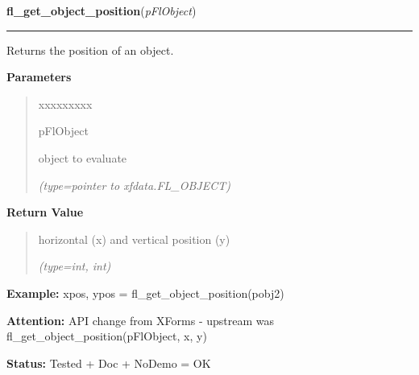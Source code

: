     \vspace{0.5ex}

\hspace{.8\funcindent}\begin{boxedminipage}{\funcwidth}

    \raggedright \textbf{fl\_get\_object\_position}(\textit{pFlObject})

    \vspace{-1.5ex}

    \rule{\textwidth}{0.5\fboxrule}
\setlength{\parskip}{2ex}
    Returns the position of an object.

\setlength{\parskip}{1ex}
      \textbf{Parameters}
      \vspace{-1ex}

      \begin{quote}
        \begin{Ventry}{xxxxxxxxx}

          \item[pFlObject]

          object to evaluate

            {\it (type=pointer to xfdata.FL\_OBJECT)}

        \end{Ventry}

      \end{quote}

      \textbf{Return Value}
    \vspace{-1ex}

      \begin{quote}
      horizontal (x) and vertical position (y)

      {\it (type=int, int)}

      \end{quote}

\textbf{Example:} xpos, ypos = fl\_get\_object\_position(pobj2)



\textbf{Attention:} API change from XForms - upstream was fl\_get\_object\_position(pFlObject, 
x, y)



\textbf{Status:} Tested + Doc + NoDemo = OK



    \end{boxedminipage}

    \label{xformslib:flbasic:fl_get_object_bbox}

